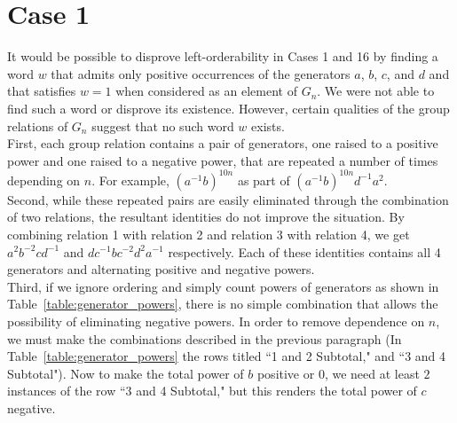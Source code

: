 \section{Case 1}
\label{section:case1}

\noindent{}It would be possible to disprove left-orderability in Cases 1 and 16 by finding a word $w$ that admits only positive occurrences of the generators $a$, $b$, $c$, and $d$ and that satisfies $w=1$ when considered as an element of $G_n$. We were not able to find such a word or disprove its existence. However, certain qualities of the group relations of $G_n$ suggest that no such word $w$ exists.\\

\noindent{}First, each group relation contains a pair of generators, one raised to a positive power and one raised to a negative power, that are repeated a number of times depending on $n$. For example, $(a^{-1}b)^{10n}$ as part of $(a^{-1}b)^{10n}d^{-1}a^{2}$.\\

\noindent{}Second, while these repeated pairs are easily eliminated through the combination of two relations, the resultant identities do not improve the situation. By combining relation 1 with relation 2 and relation 3 with relation 4, we get $a^{2}b^{-2}cd^{-1}$ and $dc^{-1}bc^{-2}d^{2}a^{-1}$ respectively. Each of these identities contains all 4 generators and alternating positive and negative powers.\\

\noindent{}Third, if we ignore ordering and simply count powers of generators as shown in Table~\ref{table:generator_powers}, there is no simple combination that allows the possibility of eliminating negative powers. In order to remove dependence on $n$, we must make the combinations described in the previous paragraph (In Table~\ref{table:generator_powers} the rows titled ``1 and 2 Subtotal," and ``3 and 4 Subtotal"). Now to make the total power of $b$ positive or $0$, we need at least $2$ instances of the row ``3 and 4 Subtotal," but this renders the total power of $c$ negative.\\

